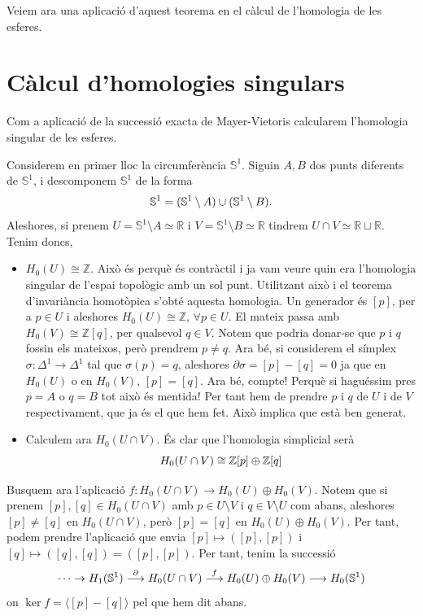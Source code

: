 \documentclass[../main.tex]{subfiles}
\begin{document}
Veiem ara una aplicació d'aquest teorema en el càlcul de l'homologia de les esferes.

\section{Càlcul d'homologies singulars}


Com a aplicació de la successió exacta de Mayer-Vietoris calcularem l'homologia singular de les esferes.

Considerem en primer lloc la circumferència $\mathbb{S}^1$. Siguin $A,B$ dos punts diferents de $\mathbb{S}^1$, i descomponem $\mathbb{S}^1$ de la forma
\begin{equation}
    \notag
    \mathbb{S}^1 = (\mathbb{S}^1\setminus A)\cup(\mathbb{S}^1\setminus B).
\end{equation}
Aleshores, si prenem $U = \mathbb{S}^1\setminus A\simeq\mathbb{R}$ i $V = \mathbb{S}^1\setminus B\simeq \mathbb{R}$ tindrem $U\cap V\simeq \mathbb{R}\sqcup\mathbb{R}$. Tenim doncs,
\begin{itemize}
    \item $H_0(U)\cong\mathbb{Z}$. Això és perquè és contràctil i ja vam veure quin era l'homologia singular de l'espai topològic amb un sol punt. Utilitzant això i el teorema d'invariància homotòpica s'obté aquesta homologia. Un generador és $[p]$, per a $p\in U$ i aleshores $H_0(U)\cong\mathbb{Z}$, $\forall p\in U$. El mateix passa amb $H_0(V)\cong \mathbb{Z}[q]$, per qualsevol $q\in V$. Notem que podria donar-se que $p$ i $q$ fossin els mateixos, però prendrem $p\not=q$. Ara bé, si considerem el símplex $\sigma:\Delta^1\rightarrow \Delta^1$ tal que $\sigma(p)=q$, aleshores $\partial\sigma = [p]-[q] = 0$ ja que en $H_0(U)$ o en $H_0(V)$, $[p] = [q]$. Ara bé, compte! Perquè si haguéssim pres $p = A$ o $q = B$ tot això és mentida! Per tant hem de prendre $p$ i $q$ de $U$ i de $V$ respectivament, que ja és el que hem fet. Això implica que està ben generat.
    
    \item Calculem ara $H_0(U\cap V)$. És clar que l'homologia simplicial serà
    \begin{equation}
        \notag
        H_0(U\cap V) \cong\mathbb{Z}[p]\oplus\mathbb{Z}[q]
    \end{equation}
\end{itemize}   

Busquem ara l'aplicació $f:H_0(U\cap V)\rightarrow H_0(U)\oplus H_0(V)$. Notem que si prenem $[p],[q]\in H_0(U\cap V)$ amb $p\in U\setminus V$ i $q\in V\setminus U$ com abans, aleshores $[p]\not=[q]$ en $H_0(U\cap V)$, però $[p] = [q]$ en $H_0(U)\oplus H_0(V)$. Per tant, podem prendre l'aplicació que envia $[p]\mapsto([p],[p])$ i $[q]\mapsto([q],[q])=([p],[p])$. Per tant, tenim la successió
\begin{equation}
    \notag
    \cdots \rightarrow H_1(\mathbb{S}^1)\overset{\partial}{\longrightarrow} H_0(U\cap V)\overset{f}{\longrightarrow} H_0(U)\oplus H_0(V)\longrightarrow H_0(\mathbb{S}^1)
\end{equation}
on $\ker f = \langle [p]-[q]\rangle$ pel que hem dit abans. 
\end{document}
